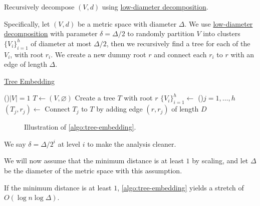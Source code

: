 \begin{intuition}
	Recursively decompose \((V, d)\) using \hyperref[def:low-diameter-decomposition]{low-diameter decomposition}.
\end{intuition}

Specifically, let \((V, d)\) be a metric space with diameter \(\Delta \). We use \hyperref[def:low-diameter-decomposition]{low-diameter decomposition} with parameter \(\delta = \Delta / 2\) to randomly partition \(V\) into clusters \(\{ V_i \} _{i=1}^{h}\) of diameter at most \(\Delta / 2\), then we recursively find a tree for each of the \(V_i\), with root \(r_i\). We create a new dummy root \(r\) and connect each \(r_i\) to \(r\) with an edge of length \(\Delta \).

\begin{algorithm}[H]\label{algo:tree-embedding}
	\DontPrintSemicolon{}
	\caption{\hyperref[prb:tree-embedding]{Tree Embedding}}

	\BlankLine

	\If(){\(\lvert V \rvert = 1\)}{
		\(T \gets (V, \varnothing )\)\;
	}
	\;
	Create a tree \(T\) with root \(r\)\;
	\(\{ V_i \} _{i=1}^{h} \gets\)\;
	\For(){\(j = 1, \dots , h\)}{
		\((T_j, r_j)\gets\)\;
		Connect \(T_j\) to \(T\) by adding edge \((r, r_j)\) of length \(D\)\;
	}
	\;
\end{algorithm}

\begin{figure}[H]
	\centering
	\caption{Illustration of \autoref{algo:tree-embedding}.}
	\label{fig:algo:tree-embedding}
\end{figure}

\begin{notation}
	We say \(\delta = \Delta / 2^i\) at level \(i\) to make the analysis cleaner.
\end{notation}

We will now assume that the minimum distance is at least \(1\) by scaling, and let \(\Delta \) be the diameter of the metric space with this assumption.

\begin{remark}
	If the minimum distance is at least \(1\), \autoref{algo:tree-embedding} yields a stretch of \(O(\log n \log \Delta )\).
\end{remark}

